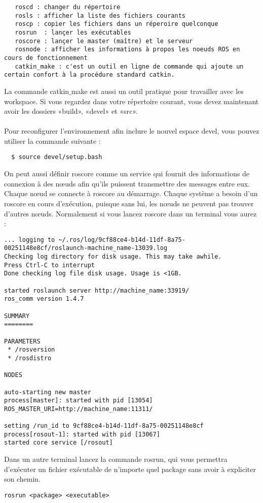 \documentclass[a4paper,french, titlepage]{book}
\begin{document}
\begin{Verbatim}
   roscd : changer du répertoire 
   rosls : afficher la liste des fichiers courants
   roscp : copier les fichiers dans un réperoire quelconque
   rosrun  : lançer les exécutables 
   roscore : lançer le master (maître) et le serveur
   rosnode : afficher les informations à propos les noeuds ROS en cours de fonctionnement
   catkin_make : c'est un outil en ligne de commande qui ajoute un certain confort à la procédure standard catkin. 
\end{Verbatim}

La commande  catkin$\_$make est aussi un outil pratique pour travailler avec les workspace. Si vous regardez dans votre  répertoire courant, vous devez maintenant avoir les dossiers «build», «devel» et «src». \\\\ 
Pour reconfigurer l'environnement afin inclure le nouvel espace devel, vous pouvez utiliser la commande suivante :
\begin{Verbatim}
  $ source devel/setup.bash 
\end{Verbatim}
On peut aussi définir roscore comme un service qui fournit des informations de connexion à des nœuds afin qu'ils puissent transmettre des messages entre eux. Chaque nœud se connecte à roscore au démarrage. Chaque système a besoin d'un roscore en cours d'exécution, puisque sans lui, les nœuds ne peuvent pas trouver d'autres nœuds. Normalement si vous lancez roscore dans un terminal vous aurez :
\begin{Verbatim}
... logging to ~/.ros/log/9cf88ce4-b14d-11df-8a75-00251148e8cf/roslaunch-machine_name-13039.log
Checking log directory for disk usage. This may take awhile.
Press Ctrl-C to interrupt
Done checking log file disk usage. Usage is <1GB.

started roslaunch server http://machine_name:33919/
ros_comm version 1.4.7

SUMMARY
========

PARAMETERS
 * /rosversion
 * /rosdistro

NODES

auto-starting new master
process[master]: started with pid [13054]
ROS_MASTER_URI=http://machine_name:11311/

setting /run_id to 9cf88ce4-b14d-11df-8a75-00251148e8cf
process[rosout-1]: started with pid [13067]
started core service [/rosout]
\end{Verbatim}
Dans un autre terminal lancez la commande rosrun, qui vous permettra d'exécuter un fichier exécutable de n'importe quel package sans avoir à expliciter son chemin.
\begin{Verbatim} 
rosrun <package> <executable>
\end{Verbatim}
\end{document}
